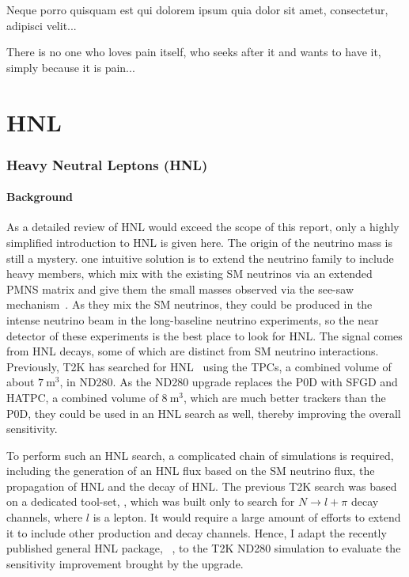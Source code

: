 \begin{savequote}[8cm]
\textlatin{Neque porro quisquam est qui dolorem ipsum quia dolor sit amet, consectetur, adipisci velit...}

There is no one who loves pain itself, who seeks after it and wants to have it, simply because it is pain...
\end{savequote}

\chapter{\label{ch:6-hnl}HNL} 

\minitoc


    \subsection{Heavy Neutral Leptons (HNL)}
    \subsubsection{Background}
        As a detailed review of HNL would exceed the scope of this report, only a highly simplified introduction to HNL is given here. The origin of the neutrino mass is still a mystery. 
        one intuitive solution is to extend the neutrino family to include heavy members, which mix with the existing SM neutrinos via an extended PMNS matrix and give them the small masses observed via the see-saw mechanism~\cite{Abada_2007}. As they mix the SM neutrinos, they could be produced in the intense neutrino beam in the long-baseline neutrino experiments, so the near detector of these experiments is the best place to look for HNL. The signal comes from HNL decays, some of which are distinct from SM neutrino interactions. Previously, T2K has searched for HNL~\cite{T2K:2019jwa} using the TPCs, a combined volume of about $7~\textrm{m}^3$, in ND280. As the ND280 upgrade replaces the P0D with SFGD and HATPC, a combined volume of $8~\textrm{m}^3$, which are much better trackers than the P0D, they could be used in an HNL search as well, thereby improving the overall sensitivity. 

        To perform such an HNL search, a complicated chain of simulations is required, including the generation of an HNL flux based on the SM neutrino flux, the propagation of HNL and the decay of HNL. The previous T2K search was based on a dedicated tool-set, , which was built only to search for $N\rightarrow l + \pi$ decay channels, where $l$ is a lepton. It would require a large amount of efforts to extend it to include other production and decay channels. Hence, I adapt the recently published general HNL package, ~\cite{Plows:2022gxc}, to the T2K ND280 simulation to evaluate the sensitivity improvement brought by the upgrade.

